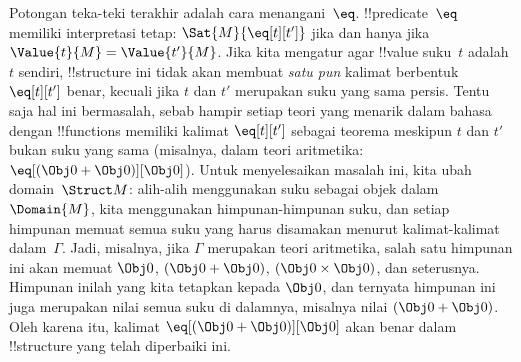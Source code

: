 \documentclass[../../../include/open-logic-section]{subfiles}
\begin{document}
{Potongan teka-teki terakhir adalah cara menangani~$\eq$.
!!{predicate}~$\eq$ memiliki interpretasi tetap:
$\Sat{M}{\eq[t][t']}$ jika dan hanya jika $\Value{t}{M} =
\Value{t'}{M}$. Jika kita mengatur agar !!{value} suku~$t$ adalah $t$
sendiri, !!{structure} ini tidak akan membuat \emph{satu pun} kalimat
berbentuk $\eq[t][t']$ benar, kecuali jika $t$ dan $t'$ merupakan suku
yang sama persis. Tentu saja hal ini bermasalah, sebab hampir setiap
teori yang menarik dalam bahasa dengan !!{function}s memiliki kalimat
$\eq[t][t']$ sebagai teorema meskipun $t$ dan $t'$ bukan suku yang sama
(misalnya, dalam teori aritmetika: $\eq[(\Obj 0+ \Obj 0)][\Obj 0]$).
Untuk menyelesaikan masalah ini, kita ubah domain~$\Struct M$: alih-alih
menggunakan suku sebagai objek dalam~$\Domain{M}$, kita menggunakan
himpunan-himpunan suku, dan setiap himpunan memuat semua suku yang harus
disamakan menurut kalimat-kalimat dalam~$\Gamma$. Jadi, misalnya, jika
$\Gamma$ merupakan teori aritmetika, salah satu himpunan ini akan memuat
$\Obj 0$, $(\Obj 0 + \Obj 0)$, $(\Obj 0 \times \Obj 0)$, dan seterusnya.
Himpunan inilah yang kita tetapkan kepada $\Obj 0$, dan ternyata himpunan
ini juga merupakan nilai semua suku di dalamnya, misalnya nilai
$(\Obj 0 + \Obj 0)$. Oleh karena itu, kalimat
$\eq[(\Obj 0+ \Obj 0)][\Obj 0]$ akan benar dalam !!{structure} yang
telah diperbaiki ini.}{}
\end{document}
